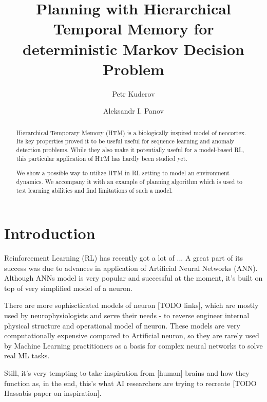 \documentclass[runningheads]{llncs}
\begin{document}
\title {Planning with Hierarchical Temporal Memory for deterministic Markov Decision Problem}
\author {Petr Kuderov  \and Aleksandr I. Panov }

%

\maketitle

\begin{abstract}
  Hierarchical Temporary Memory (HTM) is a biologically inspired model of neocortex. Its key properties proved it to be useful useful for sequence learning and anomaly detection problems. While they also make it potentially useful for a model-based RL, this particular application of HTM has hardly been studied yet.

  We show a possible way to utilize HTM in RL setting to model an environment dynamics. We accompany it with an example of planning algorithm which is used to test learning abilities and find limitations of such a model.
\end{abstract}


\section{Introduction}

Reinforcement Learning (RL) has recently got a lot of ... A great part of its success was due to advances in application of Artificial Neural Networks (ANN). Although ANNs model is very popular and successful at the moment, it's built on top of very simplified model of a neuron.

There are more sophiscticated models of neuron [TODO links], which are mostly used by neurophysiologists and serve their needs - to reverse engineer internal physical structure and operational model of neuron. These models are very computationally expensive compared to Artificial neuron, so they are rarely used by Machine Learning practitioners as a basis for complex neural networks to solve real ML tasks.

Still, it's very tempting to take inspiration from [human] brains and how they function as, in the end, this's what AI researchers are trying to recreate [TODO Hassabis paper on inspiration].
\end{document}
